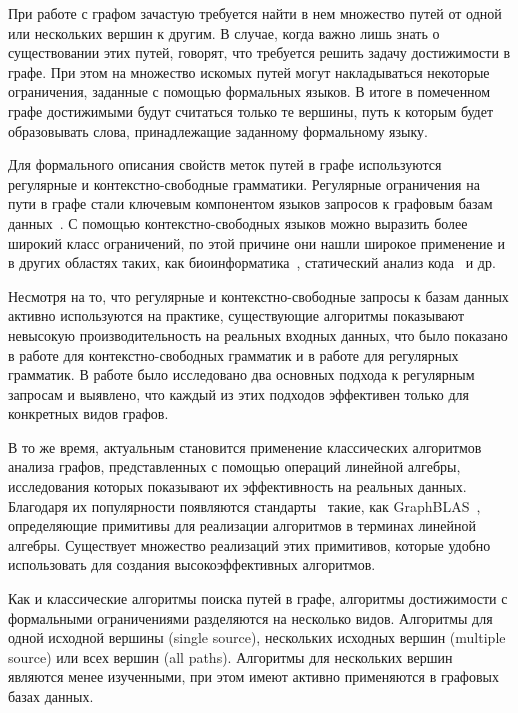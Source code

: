 
При работе с графом зачастую требуется найти в нем множество путей от одной или нескольких вершин к другим. В случае, когда важно лишь знать о существовании этих путей, говорят, что требуется решить задачу достижимости в графе. При этом на множество искомых путей могут накладываться некоторые ограничения, заданные с помощью формальных языков. В итоге в помеченном графе достижимыми будут считаться только те вершины, путь к которым будет образовывать слова, принадлежащие заданному формальному языку.

Для формального описания свойств меток путей в графе используются регулярные и контекстно-свободные грамматики. Регулярные ограничения на пути в графе стали ключевым компонентом языков запросов к графовым базам данных~\cite{intro_rpq}. С помощью контекстно-свободных языков можно выразить более широкий класс ограничений, по этой причине они нашли широкое применение и в других областях таких, как биоинформатика~\cite{intro_bioinf}, статический анализ кода~\cite{intro_code_analysis} и др.

Несмотря на то, что регулярные и контекстно-свободные запросы к базам данных активно используются на практике, существующие алгоритмы показывают невысокую производительность на реальных входных данных, что было показано в работе \cite{intro_eval_cfpq} для контекстно-свободных грамматик и в работе \cite{intro_eval_rpq} для регулярных грамматик. В работе \cite{intro_eval_rpq} было исследовано два основных подхода к регулярным запросам и выявлено, что каждый из этих подходов эффективен только для конкретных видов графов.

В то же время, актуальным становится применение классических алгоритмов анализа графов, представленных с помощью операций линейной алгебры, исследования которых показывают их эффективность на реальных данных. Благодаря их популярности появляются стандарты~\cite{intro_standards_for_graph_algorithm_primitives} такие, как GraphBLAS~\cite{intro_graphblas}, определяющие примитивы для реализации алгоритмов в терминах линейной алгебры. Существует множество реализаций этих примитивов, которые удобно использовать для создания высокоэффективных алгоритмов. 

Как и классические алгоритмы поиска путей в графе, алгоритмы достижимости с формальными ограничениями разделяются на несколько видов. Алгоритмы для одной исходной вершины (single source), нескольких исходных вершин (multiple source) или всех вершин (all paths). Алгоритмы для нескольких вершин являются менее изученными, при этом имеют активно применяются в графовых базах данных.

